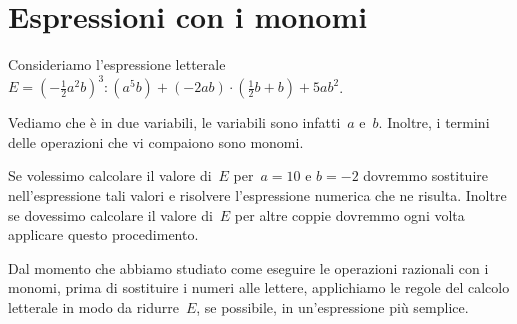 \ovalbox{\risolvii \ref{ese:9.26}, \ref{ese:9.27}, \ref{ese:9.28}, \ref{ese:9.29}, \ref{ese:9.30}, \ref{ese:9.31}, \ref{ese:9.32}}

\section{Espressioni con i monomi}
Consideriamo l'espressione letterale
$E=\left(-{\frac{1}{2}}a^{2}b\right)^{3}:(a^{5}b)+(-2ab)\cdot\left(\frac{1}{2}b+b\right)+5ab^{2}$.

Vediamo che è in due variabili, le variabili sono infatti~$a$ e~$b$. Inoltre, i termini delle operazioni che vi compaiono sono monomi.

Se volessimo calcolare il valore di~$E$ per~$a = 10$ e $b = -2$ dovremmo
sostituire nell'espressione tali valori e risolvere
l'espressione numerica che ne risulta. Inoltre se
dovessimo calcolare il valore di~$E$ per altre coppie dovremmo ogni volta
applicare questo procedimento.

Dal momento che abbiamo studiato come eseguire le operazioni razionali
con i monomi, prima di sostituire i numeri alle lettere, applichiamo le
regole del calcolo letterale in modo da ridurre~$E$, se possibile,
in un'espressione più semplice.

